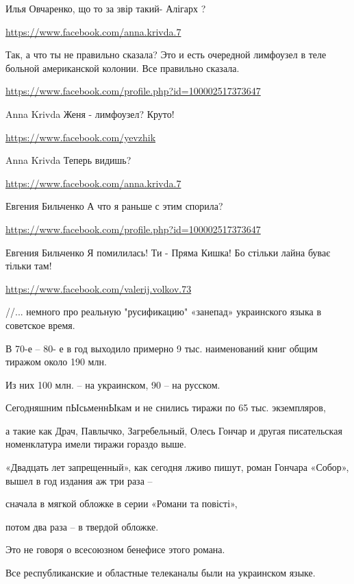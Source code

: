\documentclass[a4paper,11pt]{extreport}
\begin{document}
\begin{itemize}
\begin{itemize}
Илья Овчаренко, що то за звір такий- Алігарх ?

\end{itemize}
\url{https://www.facebook.com/anna.krivda.7}

Так, а что ты не правильно сказала? Это и есть очередной лимфоузел в теле больной американской колонии. Все правильно сказала.

\begin{itemize}
\url{https://www.facebook.com/profile.php?id=100002517373647}

Anna Krivda Женя - лимфоузел? Круто!

\url{https://www.facebook.com/yevzhik}

Anna Krivda Теперь видишь?

\url{https://www.facebook.com/anna.krivda.7}

Евгения Бильченко А что я раньше с этим спорила?

\url{https://www.facebook.com/profile.php?id=100002517373647}

Евгения Бильченко Я помилилась! Ти - Пряма Кишка! Бо стільки лайна буває тільки там!

\end{itemize}
\url{https://www.facebook.com/valerij.volkov.73}

//... немного про реальную "русификацию" «занепад» украинского языка в советское время.

В 70-е – 80- е
в год выходило примерно 9 тыс. наименований книг общим тиражом около 190 млн.

Из них 100 млн. – на украинском, 90 – на русском.

Сегодняшним пЫсьменнЫкам и не снились тиражи по 65 тыс. экземпляров,

а такие как Драч, Павлычко, Загребельный, Олесь Гончар и другая писательская номенклатура имели тиражи гораздо выше.

«Двадцать лет запрещенный», как сегодня лживо пишут, роман Гончара «Собор», вышел в год издания аж три раза –

сначала в мягкой обложке в серии «Романи та повісті»,

потом два раза – в твердой обложке.

Это не говоря о всесоюзном бенефисе этого романа.

Все республиканские и областные телеканалы были на украинском языке.


\end{itemize}
\end{document}
